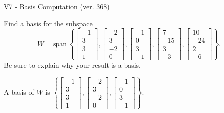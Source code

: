 \begin{exercise}
  \begin{exerciseTitle}V7 - Basis Computation (ver. 368)\end{exerciseTitle}
  \begin{exerciseStatement}
    Find a basis for the subspace 
\[W=\mathrm{span}\ \left\{\left[\begin{array}{r}
-1 \\
3 \\
3 \\
1
\end{array}\right] , \left[\begin{array}{r}
-2 \\
3 \\
-2 \\
0
\end{array}\right] , \left[\begin{array}{r}
-1 \\
0 \\
3 \\
-1
\end{array}\right] , \left[\begin{array}{r}
7 \\
-15 \\
3 \\
-3
\end{array}\right] , \left[\begin{array}{r}
10 \\
-24 \\
2 \\
-6
\end{array}\right]\right\}.\]
 Be sure to explain why your result is a basis.


  \end{exerciseStatement}
  \begin{exerciseAnswer}
   A basis of \(W\) is  \(\left\{\left[\begin{array}{r}
-1 \\
3 \\
3 \\
1
\end{array}\right] , \left[\begin{array}{r}
-2 \\
3 \\
-2 \\
0
\end{array}\right] , \left[\begin{array}{r}
-1 \\
0 \\
3 \\
-1
\end{array}\right]\right\}\).
  


  \end{exerciseAnswer}
\end{exercise}